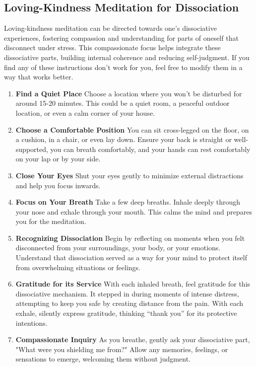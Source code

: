 \documentclass[12pt,letterpaper]{book}
\begin{document}
\subsection{Loving-Kindness Meditation for Dissociation}
\label{lkmeditation}
Loving-kindness meditation can be directed towards one's dissociative experiences, fostering compassion and understanding for parts of oneself that disconnect under stress. This compassionate focus helps integrate these dissociative parts, building internal coherence and reducing self-judgment. If you find any of these instructions don't work for you, feel free to modify them in a way that works better. 
\begin{enumerate}
    \item \textbf{Find a Quiet Place} Choose a location where you won't be disturbed for around 15-20 minutes. This could be a quiet room, a peaceful outdoor location, or even a calm corner of your house.
    \item \textbf{Choose a Comfortable Position} You can sit cross-legged on the floor, on a cushion, in a chair, or even lay down. Ensure your back is straight or well-supported, you can breath comfortably, and your hands can rest comfortably on your lap or by your side.
    \item \textbf{Close Your Eyes} Shut your eyes gently to minimize external distractions and help you focus inwards.
    \item \textbf{Focus on Your Breath} Take a few deep breaths. Inhale deeply through your nose and exhale through your mouth. This calms the mind and prepares you for the meditation.
    \item \textbf{Recognizing Dissociation} Begin by reflecting on moments when you felt disconnected from your surroundings, your body, or your emotions. Understand that dissociation served as a way for your mind to protect itself from overwhelming situations or feelings.
    \item \textbf{Gratitude for its Service} With each inhaled breath, feel gratitude for this dissociative mechanism. It stepped in during moments of intense distress, attempting to keep you safe by creating distance from the pain. With each exhale, silently express gratitude, thinking “thank you” for its protective intentions.
    \item \textbf{Compassionate Inquiry} As you breathe, gently ask your dissociative part, "What were you shielding me from?" Allow any memories, feelings, or sensations to emerge, welcoming them without judgment.

\end{enumerate}
\end{document}
